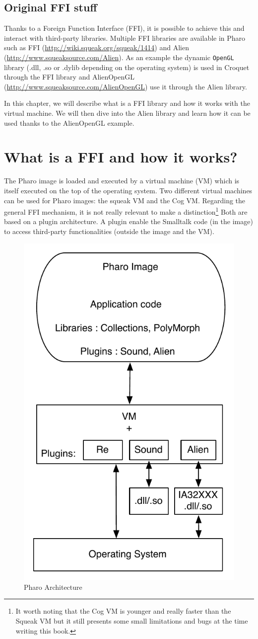 \documentclass[a4paper,10pt,twoside]{book}
\begin{document}
\newpage
\subsection{Original FFI stuff}

Thanks to a Foreign Function Interface (FFI), it is possible to achieve this and interact with third-party libraries.
Multiple FFI libraries are available in Pharo such as FFI (\url{http://wiki.squeak.org/squeak/1414}) and Alien (\url{http://www.squeaksource.com/Alien}).
As an example the dynamic \texttt{OpenGL} library (.dll, .so or .dylib depending on the operating system) is used in Croquet through the FFI library and AlienOpenGL (\url{http://www.squeaksource.com/AlienOpenGL}) use it through the Alien library.

In this chapter, we will describe what is a FFI library and how it works with the virtual machine. 
We will then dive into the Alien library and learn how it can be used thanks to the AlienOpenGL example.

\section{What is a FFI and how it works?}

The Pharo image is loaded and executed by a virtual machine (VM) which is itself executed on the top of the operating system. 
Two different virtual machines can be used for Pharo images: the squeak VM and the Cog VM.
Regarding the general FFI mechanism, it is not really relevant to make a distinction\footnote{It worth noting that the Cog VM is younger and really faster than the Squeak VM but it still presents some small limitations and bugs at the time writing this book.} 
Both are based on a plugin architecture.
A plugin enable the Smalltalk code (in the image) to access third-party functionalities (outside the image and the VM).

\begin{figure}[htbp]
	\centering
		\includegraphics[width=0.4\linewidth]{figs/plugins.pdf}
	\caption{Pharo Architecture}
	\label{fig:plugins}
\end{figure}
\end{document}
